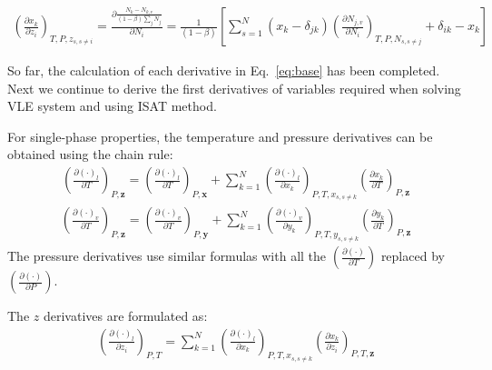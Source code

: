 
\begin{align}\left(\frac{\partial x_k}{\partial z_i}\right)_{T,P,z_{s,s\neq i}}= \frac{\partial \frac{N_k-N_{k,v}} { (1-\beta) \sum_j N_j}}{\partial N_i} = \frac{1}{(1-\beta) } \left[\sum_{s=1}^N\left(x_k - \delta _{jk}\right)\left(\frac{\partial N_{j,v}}{\partial N_i}\right)_{T,P,N_{s,s\neq j}}+\delta_{ik}-x_k\right]
\end{align}



So far, the calculation of each derivative in Eq.~\ref{eq:base} has been completed. Next we continue to derive the first derivatives of variables required when solving VLE system and using ISAT method.

For single-phase properties, the temperature and pressure derivatives can be obtained using the chain rule:
\begin{align}
	\left(\frac{\partial (\cdot)_l}{\partial T}\right)_{P,\mathbf{z}} = \left(\frac{\partial (\cdot)_l}{\partial T}\right)_{P,\mathbf{x}} + \sum_{k=1}^N\left(\frac{\partial (\cdot)_l}{\partial x_k}\right)_{P,T,x_{s,s\neq k}}\left(\frac{\partial x_k}{\partial T}\right)_{P,\mathbf{z}} \label{eq:dvdT}
\end{align}
\begin{align}
	\left(\frac{\partial (\cdot)_v}{\partial T}\right)_{P,\mathbf{z}} = \left(\frac{\partial (\cdot)_v}{\partial T}\right)_{P,\mathbf{y}} + \sum_{k=1}^N\left(\frac{\partial (\cdot)_v}{\partial y_k}\right)_{P,T,y_{s,s\neq k}}\left(\frac{\partial y_k}{\partial T}\right)_{P,\mathbf{z}} \label{eq:dldT}
\end{align}
The pressure derivatives use similar formulas with all the $\left(\frac{\partial (\cdot)}{\partial T }\right)$ replaced by $\left(\frac{\partial (\cdot)}{\partial P }\right)$.

The $z$ derivatives are formulated as:
\begin{align}
	\left(\frac{\partial (\cdot)_l}{\partial z_i}\right)_{P,T} =  \sum_{k=1}^N\left(\frac{\partial (\cdot)_l}{\partial x_k}\right)_{P,T,x_{s,s\neq k}}\left(\frac{\partial x_k}{\partial z_i}\right)_{P,T,\mathbf{z}} \label{eq:dldz}
\end{align}

